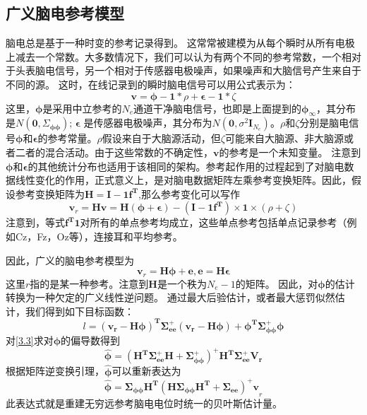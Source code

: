 \subsection{广义脑电参考模型}
脑电总是基于一种时变的参考记录得到。 这常常被建模为从每个瞬时从所有电极上减去一个常数。大多数情况下，我们可以认为有两个不同的参考常数，一个相对于头表脑电信号，另一个相对于传感器电极噪声，如果噪声和大脑信号产生来自于不同的源。 这时，在线记录到的瞬时脑电信号可以用公式表示为：
\begin{equation}\label{f3.1}
\mathbf{v}=\mathbf{\phi}-\mathbf{1}*\rho+\mathbf{\epsilon}-\mathbf{1}*\zeta
\end{equation}
这里，$\mathbf{\phi}$是采用中立参考的$N_{e}$通道干净脑电信号，也即是上面提到的$\mathbf{\phi}_{\infty}$，其分布是$N(\mathbf{0},\Sigma_{\mathbf{\phi}\mathbf{\phi}})$; $\mathbf{\epsilon}$ 是传感器电极噪声，其分布为$N(\mathbf{0},\sigma^{2}\mathbf{I}_{N_{e}})$。$\rho$和$\zeta$分别是脑电信号$\mathbf{\phi}$和$\mathbf{\epsilon}$的参考常量。$\rho$假设来自于大脑源活动，但$\zeta$可能来自大脑源、非大脑源或者二者的混合活动。由于这些常数的不确定性，$\mathbf{v}$的参考是一个未知变量。 注意到$\mathbf{\phi}$和$\mathbf{\epsilon}$的其他统计分布也适用于该相同的架构。参考起作用的过程起到了对脑电数据线性变化的作用，正式意义上，是对脑电数据矩阵左乘参考变换矩阵。因此，假设参考变换矩阵为$\mathbf{H=I-1f^T}$,那么参考变化可以写作
\begin{equation*}
\mathbf{v}_{r}=\mathbf{Hv}=\mathbf{H(\phi+\epsilon)}-(\mathbf{I-1f^T})\times\mathbf{1}\times(\rho+\zeta)
\end{equation*}
注意到，等式$\mathbf{f^T1}$对所有的单点参考均成立，这些单点参考包括单点记录参考（例如Cz，Fz，Oz等），连接耳和平均参考。

因此，广义的脑电参考模型为
\begin{equation}
\mathbf{v}_{r}=\mathbf{H\phi+e},\mathbf{e=H\epsilon}
\end{equation}
这里$r$指的是某一种参考。注意到$\mathbf{H}$是一个秩为$N_{e}-1$的矩阵。 因此，对$\mathbf{\phi}$的估计转换为一种欠定的广义线性逆问题。 通过最大后验估计，或者最大惩罚似然估计，我们得到如下目标函数：
\begin{equation}\label{3.3}
l=\mathbf{(v_{r}-H\phi)^{T}\Sigma_{ee}^{+}(v_{r}-H\phi)+\phi^{T}\Sigma_{\phi\phi}^{+}\phi}
\end{equation}
对\eqref{3.3}求对$\mathbf{\phi}$的偏导数得到
\begin{equation}
\hat{\mathbf{\phi}}=\mathbf{(H^T\Sigma_{ee}^{+}H+\Sigma_{\phi\phi}^{+})^{+}H^{T}\Sigma_{ee}^{+}V_{r}}
\end{equation}
根据矩阵逆变换引理，$\hat{\mathbf{\phi}}$可以重新表达为
\begin{equation}\label{3.4}
\hat{\mathbf{\phi}}=\mathbf{\Sigma_{\phi\phi}H^{T}(H\Sigma_{\phi\phi}H^{T}+\Sigma_{ee})^{+}v}_{r}
\end{equation}
此表达式就是重建无穷远参考脑电电位时统一的贝叶斯估计量。


